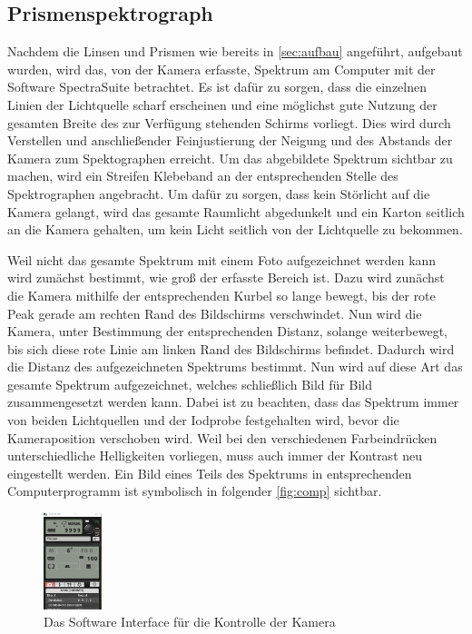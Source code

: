 \documentclass[12pt,english,ngerman]{scrartcl}
\begin{document}
\subsection{Prismenspektrograph}

Nachdem die Linsen und Prismen wie bereits in \autoref{sec:aufbau} angeführt,
aufgebaut wurden, wird das, von der Kamera erfasste, Spektrum am Computer mit
der Software SpectraSuite betrachtet. Es ist dafür zu sorgen, dass die
einzelnen Linien der Lichtquelle scharf erscheinen und eine möglichst gute
Nutzung der gesamten Breite des zur Verfügung stehenden Schirms vorliegt. Dies
wird durch Verstellen und anschließender Feinjustierung der Neigung und des
Abstands der Kamera zum Spektographen erreicht. Um das abgebildete Spektrum
sichtbar zu machen, wird ein Streifen Klebeband an der entsprechenden Stelle
des Spektrographen angebracht. Um dafür zu sorgen, dass kein Störlicht auf die
Kamera gelangt, wird das gesamte Raumlicht abgedunkelt und ein Karton seitlich
an die Kamera gehalten, um kein Licht seitlich von der Lichtquelle zu bekommen.

Weil nicht das gesamte Spektrum mit einem Foto aufgezeichnet werden kann wird
zunächst bestimmt, wie groß der erfasste Bereich ist. Dazu wird zunächst die
Kamera mithilfe der entsprechenden Kurbel so lange bewegt, bis der rote Peak
gerade am rechten Rand des Bildschirms verschwindet. Nun wird die Kamera, unter
Bestimmung der entsprechenden Distanz, solange weiterbewegt, bis sich diese
rote Linie am linken Rand des Bildschirms befindet. Dadurch wird die Distanz
des aufgezeichneten Spektrums bestimmt. Nun wird auf diese Art das gesamte
Spektrum aufgezeichnet, welches schließlich Bild für Bild zusammengesetzt
werden kann. Dabei ist zu beachten, dass das Spektrum immer von beiden
Lichtquellen und der Iodprobe festgehalten wird, bevor die Kameraposition
verschoben wird. Weil bei den verschiedenen Farbeindrücken unterschiedliche
Helligkeiten vorliegen, muss auch immer der Kontrast neu eingestellt werden.
Ein Bild eines Teils des Spektrums in entsprechenden Computerprogramm ist
symbolisch in folgender \autoref{fig:comp} sichtbar.

\begin{figure}
	\begin{center}
		\includegraphics[width=0.15\textwidth]{figures/camerasoftware.png}
	\end{center}
	\caption{Das Software Interface für die Kontrolle der Kamera
	}\label{fig:comp}
\end{figure}
\end{document}
